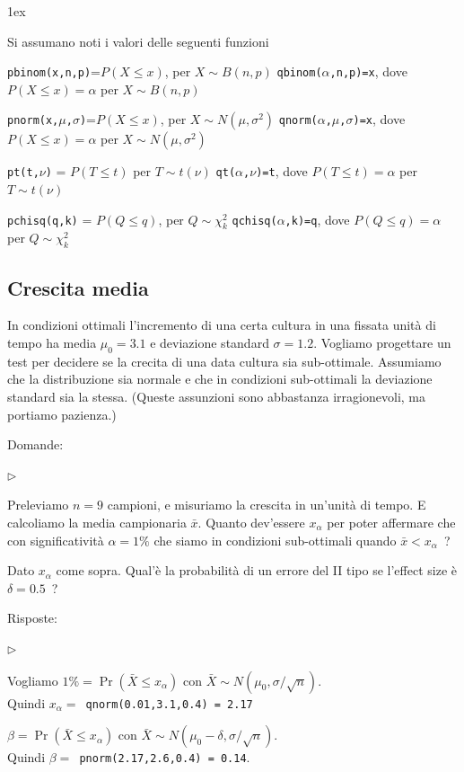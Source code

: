 \documentclass[12pt,openany]{book}
\newcommand{\mylabel}[1]{{\footnotesize\textsf{#1}}\hfill}
\renewenvironment{itemize}
  {\begin{list}{$\triangleright$}{%
   \setlength{\parskip}{0mm}
   \setlength{\topsep}{.2\baselineskip}
   \setlength{\rightmargin}{0mm}
   \setlength{\listparindent}{0mm}
   \setlength{\itemindent}{0mm}
   \setlength{\labelwidth}{3ex}
   \setlength{\itemsep}{.4\baselineskip}
   \setlength{\parsep}{0mm}
   \setlength{\partopsep}{0mm}
   \setlength{\labelsep}{1ex}
   \setlength{\leftmargin}{\labelwidth+\labelsep}
   \let\makelabel\mylabel}}{%
   \end{list}\vspace*{-1.3mm}}
\theoremstyle{mio}
\theoremstyle{liscio}
\begin{document}
\parskip1ex
{\hrulefill\scriptsize

Si assumano noti i valori delle seguenti funzioni

{\tt pbinom(x,n,p)}=$P(X\le x)$, per $X\sim B(n,p)$
\hfill 
{\tt qbinom($\alpha$,n,p)=x},  dove $P(X\le x)=\alpha$ per $X\sim B(n,p)$

{\tt pnorm(x,$\mu$,$\sigma$)}=$P(X\le x)$, per $X\sim N(\mu,\sigma^2)$
\hfill 
{\tt qnorm($\alpha$,$\mu$,$\sigma$)=x},  dove $P(X\le x)=\alpha$ per $X\sim N(\mu,\sigma^2)$

{\tt pt(t,$\nu$)} = $P(T\le t)$ per $T\sim t(\nu)$
\hfill
{\tt qt($\alpha$,$\nu$)=t}, dove $P(T\le t)=\alpha$ per $T\sim t(\nu)$

{\tt pchisq(q,k)} = $P(Q\le q)$, per $Q\sim \chi^2_k$
\hfill
{\tt qchisq($\alpha$,k)=q},  dove $P(Q\le q)=\alpha$ per $Q\sim \chi^2_k$
\par
}



\hfill{}\clearpage\subsection{Crescita media}

In condizioni ottimali l'incremento di una certa cultura in una fissata unità di tempo ha media $\mu_0=3.1$ e deviazione standard $\sigma=1.2$. Vogliamo progettare un test per decidere se la crecita di una data cultura sia sub-ottimale. Assumiamo che la distribuzione sia normale e che in condizioni sub-ottimali la deviazione standard sia la stessa. (Queste assunzioni sono abbastanza irragionevoli, ma portiamo pazienza.)

Domande:

\begin{itemize}
\item[1] Preleviamo $n=9$ campioni, e misuriamo la crescita in un'unità di tempo. E calcoliamo la media campionaria $\bar x$. Quanto dev'essere $x_\alpha$ per poter affermare che con significatività $\alpha=1\%$ che siamo in condizioni sub-ottimali quando $\bar x<x_\alpha$~?
\item[2] Dato $x_\alpha$ come sopra. Qual'è la probabilità di un errore del II tipo se l'effect size è $\delta=0.5$~?
\end{itemize}

Risposte:

\begin{itemize}
\item[1] Vogliamo $1\%=\Pr(\bar X\le x_\alpha)$ con $\bar X\sim N(\mu_0,\sigma/\sqrt{n})$.\\
Quindi $x_\alpha=${\tt\ qnorm(0.01,3.1,0.4)\,=\,2.17}
\item[2] $\beta=\Pr(\bar X\le x_\alpha)$ con $\bar X\sim N(\mu_0-\delta,\sigma/\sqrt{n})$.\\
Quindi  $\beta=${\tt\ pnorm(2.17,2.6,0.4)\,=\,0.14}.

\end{itemize}
\end{document}
